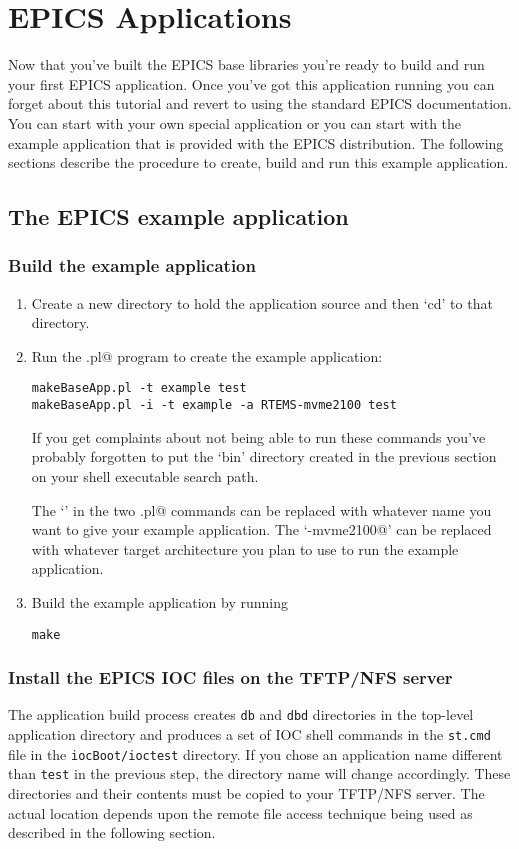 \documentclass{report}
\begin{document}
\chapter{EPICS Applications}
Now that you've built the EPICS base libraries you're ready to build and run your
first EPICS application.  Once you've got this application running you can
forget about this tutorial and revert to using the standard EPICS documentation.
You can start with your own special application or you can start with the
example application that is provided with the EPICS distribution.
The following sections
describe the procedure to create, build  and run this example application.
\section{The EPICS example application}

\subsection{Build the example application}
\begin{enumerate}

\item Create a new directory to hold the application source and
then `cd' to that directory.

\item Run the \verb@makeBaseApp.pl@ program to create the example application:
\begin{verbatim}
makeBaseApp.pl -t example test
makeBaseApp.pl -i -t example -a RTEMS-mvme2100 test
\end{verbatim}
If you get complaints about not being able to run these commands you've
probably forgotten to put the `bin'
directory created in the previous section on your shell executable search path. 

The `\verb@test@' in the two \verb@makeBaseApp.pl@ commands can be replaced with whatever name you
want to give your example application.
The `\verb@RTEMS-mvme2100@' can be replaced with whatever target architecture you
plan to use to run the example application.

\item Build the example application by running
\begin{verbatim}
make
\end{verbatim}
\end{enumerate}

\subsection{Install the EPICS IOC files on the TFTP/NFS server}
The application build process creates {\tt db} and {\tt dbd} directories
in the top-level application directory and
produces a set of IOC shell commands in
the {\tt st.cmd} file in the {\tt iocBoot/ioctest} directory.  If you chose
an application name different than {\tt test} in the previous step, the
directory name will change accordingly.
These directories and their contents
must be copied to your TFTP/NFS server.  The actual location depends upon
the remote file access technique being used as described
in the following section.
\end{document}
